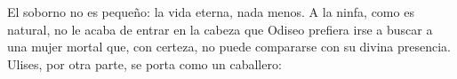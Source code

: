 El soborno no es pequeño: la vida eterna, nada menos. A la ninfa, como es natural, no le acaba de entrar en la cabeza que Odiseo prefiera irse a buscar a una mujer mortal que, con certeza, no puede compararse con su divina presencia. Ulises, por otra parte, se porta como un caballero:

